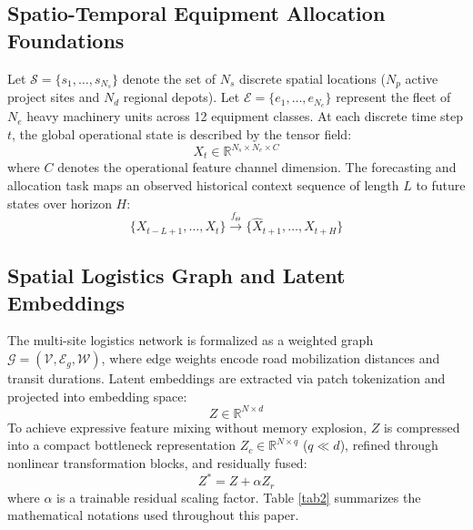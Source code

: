 \documentclass[pdflatex,sn-mathphys,Numbered]{sn-jnl}%
\begin{document}
\subsection{Spatio-Temporal Equipment Allocation Foundations}
Let $\mathcal{S} = \{s_1, \dots, s_{N_s}\}$ denote the set of $N_s$ discrete spatial locations ($N_p$ active project sites and $N_d$ regional depots). Let $\mathcal{E} = \{e_1, \dots, e_{N_e}\}$ represent the fleet of $N_e$ heavy machinery units across 12 equipment classes. At each discrete time step $t$, the global operational state is described by the tensor field:
\begin{equation}
X_t \in \mathbb{R}^{N_s \times N_e \times C} \label{eq1}
\end{equation}
where $C$ denotes the operational feature channel dimension. The forecasting and allocation task maps an observed historical context sequence of length $L$ to future states over horizon $H$:
\begin{equation}
\{X_{t-L+1}, \dots, X_t\} \xrightarrow{f_\Theta} \{\widehat{X}_{t+1}, \dots, \widehat{X}_{t+H}\} \label{eq2}
\end{equation}

\subsection{Spatial Logistics Graph and Latent Embeddings}
The multi-site logistics network is formalized as a weighted graph $\mathcal{G} = (\mathcal{V}, \mathcal{E}_g, \mathcal{W})$, where edge weights encode road mobilization distances and transit durations. Latent embeddings are extracted via patch tokenization and projected into embedding space:
\begin{equation}
Z \in \mathbb{R}^{N \times d} \label{eq3}
\end{equation}
To achieve expressive feature mixing without memory explosion, $Z$ is compressed into a compact bottleneck representation $Z_c \in \mathbb{R}^{N \times q}$ ($q \ll d$), refined through nonlinear transformation blocks, and residually fused:
\begin{equation}
Z^* = Z + \alpha Z_r \label{eq4}
\end{equation}
where $\alpha$ is a trainable residual scaling factor. Table \ref{tab2} summarizes the mathematical notations used throughout this paper.
\end{document}
